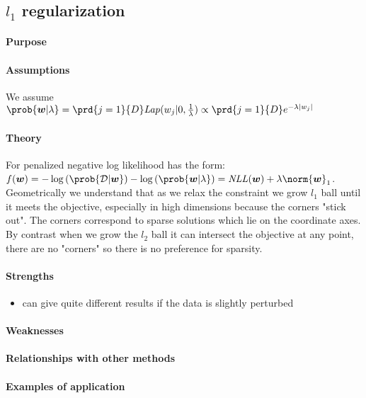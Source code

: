 \subsection{$l_{1}$ regularization}
\paragraph{Purpose}

\paragraph{Assumptions}
We assume $\prob{\bm{w}|\lambda} = \prd{j=1}{D}\text{\emph{Lap}}(w_{j}|0,
\frac{1}{\lambda}) \propto \prd{j=1}{D}e^{-\lambda|w_{j}|}$
\paragraph{Theory}
For penalized negative log likelihood has the form: $f(\bm{w}) = -\log\left(\prob{
\mathcal{D}|\bm{w}}\right) - \log\left(\prob{\bm{w}|\lambda}\right) = \text{\emph{NLL}}
(\bm{w}) + \lambda\norm{\bm{w}}_{1}$.\\
Geometrically we understand that as we relax the constraint we grow $l_{1}$ ball until
it meets the objective,  especially in high dimensions because the corners "stick
out". The corners correspond to sparse solutions which lie on the coordinate axes. By
contrast when we grow the $l_{2}$ ball it can intersect the objective at any point, 
there are no "corners" so there is no preference for sparsity. 
\paragraph{Strengths}
\begin{itemize}
    \item can give quite different results if the data is slightly perturbed
\end{itemize}

\paragraph{Weaknesses}
\paragraph{Relationships with other methods}
\paragraph{Examples of application}

